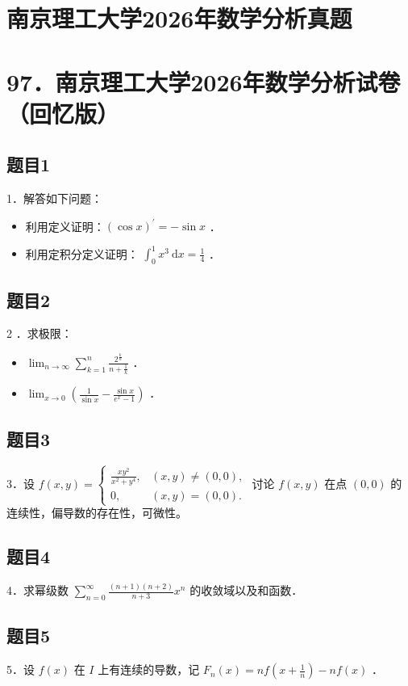 \documentclass{article}
\begin{document}
\section*{南京理工大学2026年数学分析真题}
\section*{97．南京理工大学2026年数学分析试卷（回忆版）}

\subsection{题目1}
1．解答如下问题：

\begin{itemize}
  \item[（1）] 利用定义证明：\((\cos x)^{\prime}=-\sin x\) ．
  \item[（2）] 利用定积分定义证明： \(\int_{0}^{1} x^{3} \mathrm{~d} x=\frac{1}{4}\) ．
\end{itemize}

\subsection{题目2}
2 ．求极限：

\begin{itemize}
  \item[（1）] \(\lim _{n \rightarrow \infty} \sum_{k=1}^{n} \frac{2^{\frac{k}{n}}}{n+\frac{1}{k}}\) ．
  \item[（2）] \(\lim _{x \rightarrow 0}\left(\frac{1}{\sin x}-\frac{\sin x}{e^{x}-1}\right)\) ．
\end{itemize}

\subsection{题目3}
3．设 \(f(x, y)=\left\{\begin{array}{ll}\frac{x y^{2}}{x^{2}+y^{4}}, & (x, y) \neq(0,0), \\ 0, & (x, y)=(0,0) .\end{array}\right.\) 讨论 \(f(x, y)\) 在点 \((0,0)\) 的连续性，偏导数的存在性，可微性。

\subsection{题目4}
4．求幂级数 \(\sum_{n=0}^{\infty} \frac{(n+1)(n+2)}{n+3} x^{n}\) 的收敛域以及和函数．

\subsection{题目5}
5．设 \(f(x)\) 在 \(I\) 上有连续的导数，记 \(F_{n}(x)=n f\left(x+\frac{1}{n}\right)-n f(x)\) ．
\end{document}
